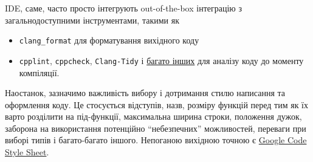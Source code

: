 \documentclass[12pt]{article}
\begin{document}
	IDE, саме, часто просто інтегрують out-of-the-box інтеграцію з загальнодоступними інструментами, такими як
	\begin{itemize}
		\item \texttt{clang\_format} для форматування вихідного коду
		\item \texttt{cpplint}, \texttt{cppcheck}, \texttt{Clang-Tidy} і \href{https://en.wikipedia.org/wiki/List_of_tools_for_static_code_analysis#C,_C++}{багато інших} для аналізу коду до моменту компіляції.
	\end{itemize}

	Наостанок, зазначимо важливість вибору і дотримання стилю написання та оформлення коду. Це стосується відступів, назв, розміру функцій перед тим як їх варто розділити на під-функції, максимальна ширина строки, положення дужок, заборона на використання потенційно ``небезпечних'' можливостей, переваги при виборі типів і багато-багато іншого. Непоганою вихідною точною є \href{https://google.github.io/styleguide/cppguide.html}{Google Code Style Sheet}.
\end{document}
